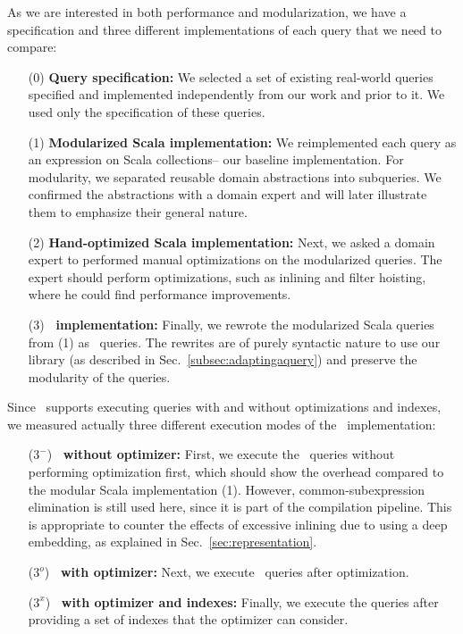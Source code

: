 \label{sec:implemenationsandspeedups}
As we are interested in both performance and modularization, we have a specification and three different implementations of each query that we need to compare:
\begin{enumerate}
	\item[(0)] \textbf{Query specification:} We selected a set of existing real-world queries specified and implemented independently from our work and prior to it. We used only the specification of these queries.

	\item[(1)] \textbf{Modularized Scala implementation:} 
	We reimplemented each query as an expression on Scala collections\--- our baseline implementation. For modularity, we separated reusable domain abstractions into subqueries. We confirmed the abstractions with a domain expert and will later illustrate them to emphasize their general nature.
	\item[(2)] \textbf{Hand-optimized Scala implementation:} Next, we asked a domain expert to performed manual optimizations on the modularized queries. The expert should perform optimizations, such as inlining and filter hoisting, where he could find performance improvements.
	\item[(3)] \textbf{\LoS\ implementation:} Finally, we rewrote the modularized Scala queries from (1) as \LoS\ queries. The rewrites are of purely syntactic nature to use our library (as described in Sec.~\ref{subsec:adaptingaquery}) and preserve the modularity of the queries.
\end{enumerate}

Since \LoS\ supports executing queries with and without optimizations and indexes, we measured actually three different execution modes of the \LoS\ implementation:
\begin{enumerate}
	\item[($3^-$)] \textbf{\LoS\ without optimizer:} First, we execute the \LoS\ queries without performing optimization first, which should show the \LoS{} overhead compared to the modular Scala implementation (1).
However, common-subexpression elimination is still used here, since it is part of the compilation pipeline. This is appropriate to counter the effects of excessive inlining due to using a deep embedding, as explained in Sec.~\ref{sec:representation}.
	\item[($3^o$)] \textbf{\LoS\ with optimizer:} Next, we execute \LoS\ queries after optimization.
	\item[($3^x$)] \textbf{\LoS\ with optimizer and indexes:} Finally, we execute the queries after providing a set of indexes that the optimizer can consider.
\end{enumerate}

